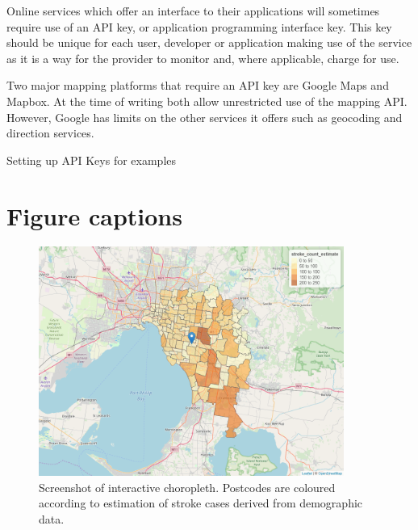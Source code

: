 \documentclass[utf8]{frontiersHLTH}
\begin{document}
Online services which offer an interface to their applications will
sometimes require use of an API key, or application programming
interface key. This key should be unique for each user, developer or
application making use of the service as it is a way for the provider to
monitor and, where applicable, charge for use.

Two major mapping platforms that require an API key are Google Maps and
Mapbox. At the time of writing both allow unrestricted use of the
mapping API. However, Google has limits on the other services it offers
such as geocoding and direction services.

Setting up API Keys for examples

\section*{Figure captions}

\begin{figure}[h!]
\begin{center}
\includegraphics[width=10cm]{choropleth}
\end{center}
\caption{Screenshot of interactive choropleth. Postcodes are coloured according to estimation of stroke cases derived from demographic data.}\label{fig:choropleth}
\end{figure}




\end{document}
